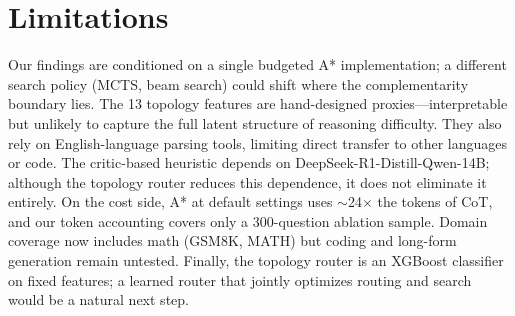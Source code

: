 \documentclass{article}
\begin{document}
\section*{Limitations}
\label{sec:limitations}
Our findings are conditioned on a single budgeted A* implementation; a different search policy (MCTS, beam search) could shift where the complementarity boundary lies. The 13 topology features are hand-designed proxies---interpretable but unlikely to capture the full latent structure of reasoning difficulty. They also rely on English-language parsing tools, limiting direct transfer to other languages or code. The critic-based heuristic depends on DeepSeek-R1-Distill-Qwen-14B; although the topology router reduces this dependence, it does not eliminate it entirely. On the cost side, A* at default settings uses $\sim$24$\times$ the tokens of CoT, and our token accounting covers only a 300-question ablation sample. Domain coverage now includes math (GSM8K, MATH) but coding and long-form generation remain untested. Finally, the topology router is an XGBoost classifier on fixed features; a learned router that jointly optimizes routing and search would be a natural next step.








\end{document}
